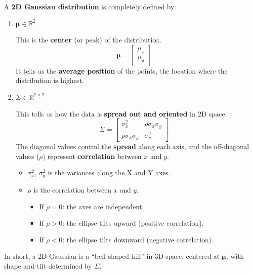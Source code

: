 \begin{remarkbox}
    \highspace
    A \textbf{2D Gaussian distribution} is completely defined by:
    \begin{enumerate}
        \item {} $\boldsymbol{\mu} \in \mathbb{R}^2$

        This is the \textbf{center} (or peak) of the distribution.
        \begin{equation}
            \boldsymbol{\mu} = \begin{bmatrix}
                \mu_{x} \\
                \mu_{y}
            \end{bmatrix}
        \end{equation}
        It tells us the \textbf{average position} of the points, the location where the distribution is highest.


        \item {} $\Sigma \in \mathbb{R}^{2 \times 2}$
        
        This tells us how the data is \textbf{spread out and oriented} in 2D space.
        \begin{equation}
            \Sigma =
            \begin{bmatrix}
                \sigma_{x}^{2}              & \rho \sigma_{x} \sigma_{y} \\
                \rho \sigma_{x} \sigma_{y}  & \sigma_{y}^{2}
            \end{bmatrix}
        \end{equation}
        The diagonal values control the \textbf{spread} along each axis, and the off-diagonal values ($\rho$) represent \textbf{correlation} between $x$ and $y$.
        \begin{itemize}
            \item $\sigma_x^2$, $\sigma_y^2$ is the variances along the X and Y axes.
            \item $\rho$ is the correlation between $x$ and $y$.
            \begin{itemize}
                \item If $\rho = 0$: the axes are independent.
                \item If $\rho > 0$: the ellipse tilts upward (positive correlation).
                \item If $\rho < 0$: the ellipse tilts downward (negative correlation).
            \end{itemize}
        \end{itemize}
    \end{enumerate}
    In short, a 2D Gaussian is a ``bell-shaped hill'' in 3D space, centered at $\boldsymbol{\mu}$, with shape and tilt determined by $\Sigma$.


\end{remarkbox}
